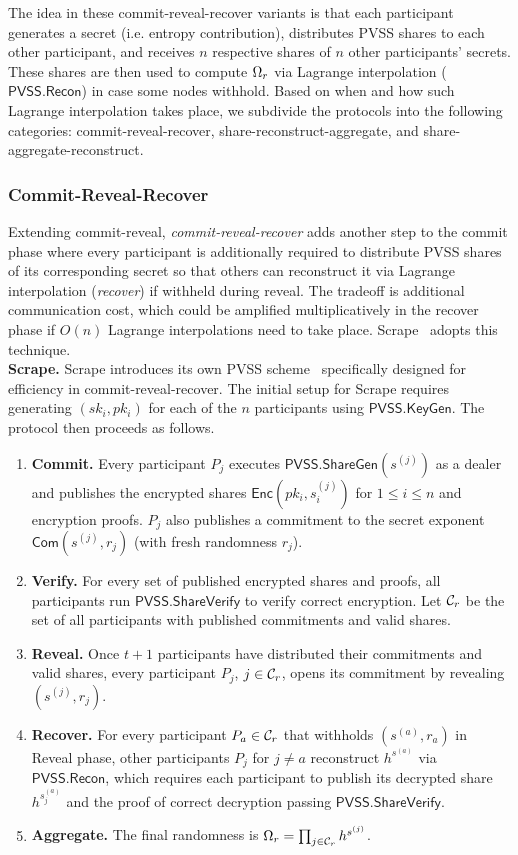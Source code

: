 The idea in these commit-reveal-recover variants is that each participant generates a secret (i.e. entropy contribution), distributes PVSS shares to each other participant, and receives $n$ respective shares of $n$ other participants' secrets. These shares are then used to compute $\Omega_r$ via Lagrange interpolation ($\mathsf{PVSS.Recon}$) in case some nodes withhold. Based on when and how such Lagrange interpolation takes place, we subdivide the protocols into the following categories: commit-reveal-recover, share-reconstruct-aggregate, and share-aggregate-reconstruct.

\subsubsection{Commit-Reveal-Recover}
Extending commit-reveal, \textit{commit-reveal-recover} adds another step to the commit phase where every participant is additionally required to distribute PVSS shares of its corresponding secret so that others can reconstruct it via Lagrange interpolation (\textit{recover}) if withheld during reveal. The tradeoff is additional communication cost, which could be amplified multiplicatively in the recover phase if $O(n)$ Lagrange interpolations need to take place. Scrape~\cite{cascudo2017scrape} adopts this technique.\\

\noindent\textbf{Scrape.} Scrape introduces its own PVSS scheme~\cite{cascudo2017scrape} specifically designed for efficiency in commit-reveal-recover. The initial setup for Scrape requires generating $(sk_i, pk_i)$ for each of the $n$ participants using $\mathsf{PVSS.KeyGen}$. The protocol then proceeds as follows.
\begin{enumerate}
\item \textbf{Commit.} Every participant $P_j$ executes $\mathsf{PVSS.ShareGen}(s^{(j)})$ as a dealer and publishes the encrypted shares $\mathsf{Enc}(pk_i, s^{(j)}_i)$ for $1 \le i \le n$ and encryption proofs. $P_j$ also publishes a commitment to the secret exponent $\mathsf{Com}(s^{(j)}, r_j)$ (with fresh randomness $r_j$).
\item \textbf{Verify.} For every set of published encrypted shares and proofs, all participants run $\mathsf{PVSS.ShareVerify}$ to verify correct encryption. Let $\mathcal{C}_r$ be the set of all participants with published commitments and valid shares.
\item \textbf{Reveal.} Once $t + 1$ participants have distributed their commitments and valid shares, every participant $P_j$, $j \in \mathcal{C}_r$, opens its commitment by revealing $(s^{(j)}, r_j)$.
\item \textbf{Recover.} For every participant $P_a \in \mathcal{C}_r$ that withholds $(s^{(a)}, r_a)$ in Reveal phase, other participants $P_j$ for $j \neq a$ reconstruct $h^{s^{(a)}}$ via $\mathsf{PVSS.Recon}$, which requires each participant to publish its decrypted share $h^{s_j^{(a)}}$ and the proof of correct decryption passing $\mathsf{PVSS.ShareVerify}$.
\item \textbf{Aggregate.} The final randomness is $\Omega_r = \prod_{j \in \mathcal{C}_r} h^{s^{(j)}}$.
\end{enumerate}

